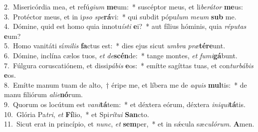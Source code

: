 {2.~}Misericórdia mea, et refú\textit{gi}\textit{um} \textbf{me}um:~* suscéptor meus, et li\textit{be}\textit{rá}\textit{tor} \textbf{me}us:\\
{3.~}Protéctor meus, et in i\textit{pso} \textit{spe}\textbf{rá}vi:~* qui subdit pópu\textit{lum} \textit{me}\textit{um} \textbf{sub} me.\\
{4.~}Dómine, quid est homo quia innotu\textit{í}\textit{sti} \textbf{e}i?~* aut fílius hóminis, quia \textit{ré}\textit{pu}\textit{tas} \textbf{e}um?\\
{5.~}Homo vanitáti sí\textit{mi}\textit{lis} \textbf{fa}ctus est:~* dies ejus sicut \textit{um}\textit{bra} \textit{præ}\textbf{té}\textbf{re}unt.\\
{6.~}Dómine, inclína cælos tuos, \textit{et} \textit{de}\textbf{scén}de:~* tange montes, \textit{et} \textit{fu}\textit{mi}\textbf{gá}bunt.\\
{7.~}Fúlgura coruscatiónem, et dissi\textit{pá}\textit{bis} \textbf{e}os:~* emítte sagíttas tuas, et con\textit{tur}\textit{bá}\textit{bis} \textbf{e}os.\\
{8.~}Emítte manum tuam de alto,~† éripe me, et líbera me de \textit{a}\textit{quis} \textbf{mul}tis:~* de manu filiórum \textit{a}\textit{li}\textit{e}\textbf{nó}rum.\\
{9.~}Quorum os locútum est \textit{va}\textit{ni}\textbf{tá}tem:~* et déxtera eórum, déxtera \textit{i}\textit{ni}\textit{qui}\textbf{tá}tis.\\
{10.~}Glória Pa\textit{tri}, \textit{et} \textbf{Fí}lio,~* et Spi\textit{rí}\textit{tu}\textit{i} \textbf{San}cto.\\
{11.~}Sicut erat in princípio, et \textit{nunc}, \textit{et} \textbf{sem}per,~* et in sǽcula sæ\textit{cu}\textit{ló}\textit{rum}. \textbf{A}men.\\
